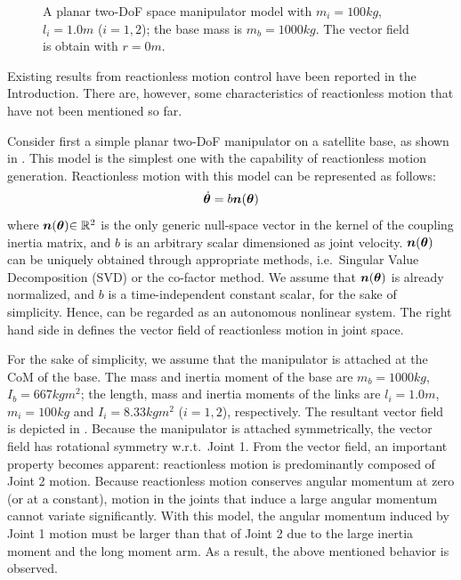 \begin{figure}[t]
\begin{minipage}[t]{0.30\linewidth}
  \end{minipage}
  \caption{A planar two-DoF space manipulator model with $m_{i} = 100\unit{kg}$,
  $l_{i} = 1.0\unit{m}$ ($i = 1, 2$); the base mass is $m_{b} = 1000\unit{kg}$.
  The vector field is obtain with $r = 0\unit{m}$.}
  \label{fig:FF2R}
\end{figure}
%
Existing results from reactionless motion control have been reported in the Introduction. 
There are, however, some  characteristics of reactionless motion that have not been mentioned so far.

Consider first a simple planar two-DoF manipulator on a satellite base, as shown in .
This model is the simplest one with the capability of reactionless motion generation.
Reactionless motion with this model can be represented as follows:
%
\begin{align}
  {\dot{\bm{\theta}}} = b\bm{n}({\bm{\theta}})\label{eq:RNSSYST}
\end{align}
%
where $\bm{n}({\bm{\theta}}){\in\mathbb{R}^{2}}$ is the only generic null-space vector in the kernel 
of the coupling inertia matrix, and $b$ is an arbitrary scalar dimensioned as joint velocity.
$\bm{n}({\bm{\theta}})$ can be uniquely obtained through appropriate methods,
i.e.\ Singular Value Decomposition (SVD) or the co-factor method.
We assume that $\bm{n}({\bm{\theta}})$ is already normalized,
and $b$ is a time-independent constant scalar, for the sake of simplicity.
Hence,  can be regarded as an autonomous nonlinear system.
The right hand side in  defines the vector field of reactionless motion
in joint space.

For the sake of simplicity, we assume that the manipulator is attached at the CoM of the base.
The mass and inertia moment of the base are $m_{b} = 1000\unit{kg}$, ${I}_{b} = 667\unit{kgm^{2}}$;
the length, mass and inertia moments of the links are $l_{i} = 1.0\unit{m}$,
$m_{i} = 100\unit{kg}$ and ${I}_{i} = 8.33\unit{kgm^{2}}$ ($i = 1,2$), respectively.
The resultant vector field is depicted in . 
Because the manipulator is attached symmetrically,
the vector field has rotational symmetry w.r.t.\ Joint 1.
From the vector field, an important property becomes apparent:  reactionless motion is predominantly 
composed of Joint 2 motion. 
Because reactionless motion  conserves  angular momentum at zero (or at a constant),
motion in the joints that induce a large angular momentum cannot variate significantly.
With this model, the angular momentum induced by Joint 1 motion must be larger than
that of Joint 2  due to the large inertia moment and the long moment arm. 
As a result, the above mentioned behavior is observed.


